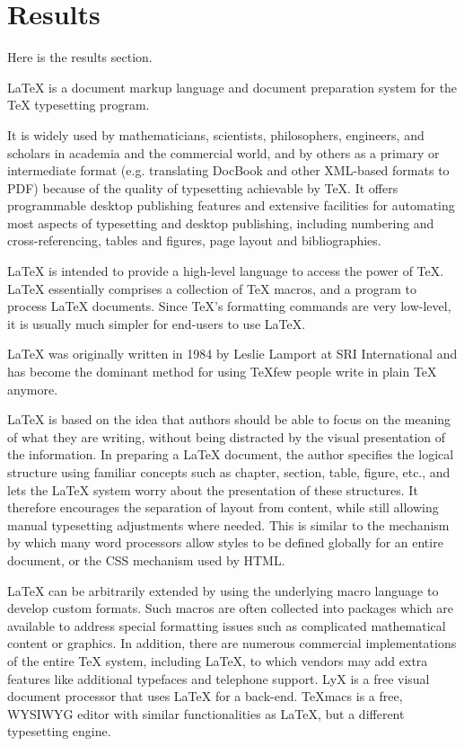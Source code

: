 \documentclass[12pt]{ucthesis}
\begin{document}
\chapter{Results}
\label{results}

Here is the results section.

LaTeX is a document markup language and document preparation system for the TeX typesetting program.

It is widely used by mathematicians, scientists, philosophers, engineers, and scholars in academia and the commercial world, and by others as a primary or intermediate format (e.g. translating DocBook and other XML-based formats to PDF) because of the quality of typesetting achievable by TeX. It offers programmable desktop publishing features and extensive facilities for automating most aspects of typesetting and desktop publishing, including numbering and cross-referencing, tables and figures, page layout and bibliographies.

LaTeX is intended to provide a high-level language to access the power of TeX. LaTeX essentially comprises a collection of TeX macros, and a program to process LaTeX documents. Since TeX's formatting commands are very low-level, it is usually much simpler for end-users to use LaTeX.

LaTeX was originally written in 1984 by Leslie Lamport at SRI International and has become the dominant method for using TeXfew people write in plain TeX anymore.

LaTeX is based on the idea that authors should be able to focus on the meaning of what they are writing, without being distracted by the visual presentation of the information. In preparing a LaTeX document, the author specifies the logical structure using familiar concepts such as chapter, section, table, figure, etc., and lets the LaTeX system worry about the presentation of these structures. It therefore encourages the separation of layout from content, while still allowing manual typesetting adjustments where needed. This is similar to the mechanism by which many word processors allow styles to be defined globally for an entire document, or the CSS mechanism used by HTML.

LaTeX can be arbitrarily extended by using the underlying macro language to develop custom formats. Such macros are often collected into packages which are available to address special formatting issues such as complicated mathematical content or graphics. In addition, there are numerous commercial implementations of the entire TeX system, including LaTeX, to which vendors may add extra features like additional typefaces and telephone support. LyX is a free visual document processor that uses LaTeX for a back-end. TeXmacs is a free, WYSIWYG editor with similar functionalities as LaTeX, but a different typesetting engine.
\end{document}
